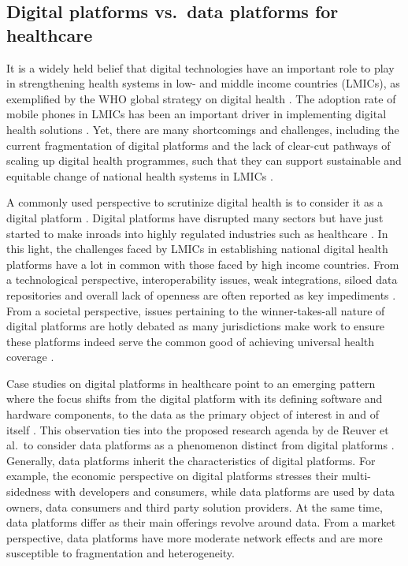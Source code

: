 \documentclass[
  authoryear]{elsarticle}
\begin{document}
\subsection{Digital platforms vs.~data platforms for
healthcare}\label{digital-platforms-vs.-data-platforms-for-healthcare}

It is a widely held belief that digital technologies have an important
role to play in strengthening health systems in low- and middle income
countries (LMICs), as exemplified by the WHO global strategy on digital
health \citep{who2021global}. The adoption rate of mobile phones in
LMICs has been an important driver in implementing digital health
solutions \citep{mccool2022mobile}. Yet, there are many shortcomings and
challenges, including the current fragmentation of digital platforms and
the lack of clear-cut pathways of scaling up digital health programmes,
such that they can support sustainable and equitable change of national
health systems in LMICs
\citep{mccool2022mobile, who2019recommendations, neumark2021digital}.

A commonly used perspective to scrutinize digital health is to consider
it as a digital platform \citep{dereuver2018digital}. Digital platforms
have disrupted many sectors but have just started to make inroads into
highly regulated industries such as healthcare \citep{ozalp2022digital}.
In this light, the challenges faced by LMICs in establishing national
digital health platforms have a lot in common with those faced by high
income countries. From a technological perspective, interoperability
issues, weak integrations, siloed data repositories and overall lack of
openness are often reported as key impediments
\citep{malm-nicolais2023exploring, mehl2023fullstac}. From a societal
perspective, issues pertaining to the winner-takes-all nature of digital
platforms are hotly debated as many jurisdictions make work to ensure
these platforms indeed serve the common good of achieving universal
health coverage \citep{sharon2018when}.

Case studies on digital platforms in healthcare point to an emerging
pattern where the focus shifts from the digital platform with its
defining software and hardware components, to the data as the primary
object of interest in and of itself
\citep{ozalp2022digital, alaimo2022organizations}. This observation ties
into the proposed research agenda by de Reuver et al.~to consider data
platforms as a phenomenon distinct from digital platforms
\citep{dereuver2022openness}. Generally, data platforms inherit the
characteristics of digital platforms. For example, the economic
perspective on digital platforms stresses their multi-sidedness with
developers and consumers, while data platforms are used by data owners,
data consumers and third party solution providers. At the same time,
data platforms differ as their main offerings revolve around data. From
a market perspective, data platforms have more moderate network effects
and are more susceptible to fragmentation and heterogeneity.
\end{document}
